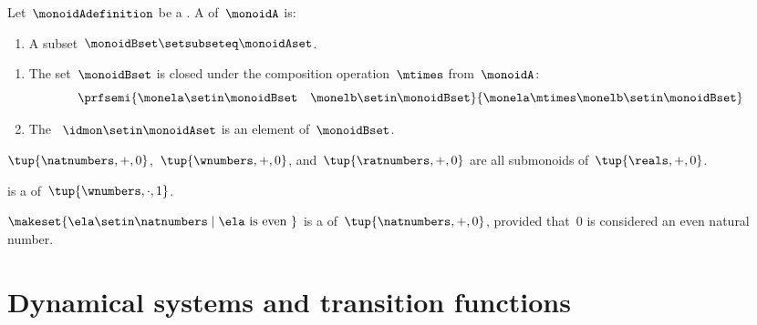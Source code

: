 \begin{definition}[Submonoids]\label{def:submonoids}
    Let~$\monoidAdefinition$ be a .
    A  of~$\monoidA$ is:

    \constit

    \begin{enumerate}
        \item A subset~$\monoidBset \setsubseteq \monoidAset$.
    \end{enumerate}

    \condit

    \begin{enumerate}
        \item The set~$\monoidBset$ is closed under the composition operation~$\mtimes$ from~$\monoidA$:
              \begin{equation}
                  \prfsemi{\monela \setin \monoidBset \quad \monelb \setin \monoidBset}{\monela \mtimes \monelb \setin \monoidBset}
              \end{equation}

        \item The ~$\idmon \setin \monoidAset$ is an element of~$\monoidBset$.
    \end{enumerate}
\end{definition}

\begin{example}
    $\tup{\natnumbers, {{+}}, 0}$,~$\tup{\wnumbers, {{+}}, 0}$, and~$\tup{\ratnumbers, {{+}}, 0}$ are all submonoids of~$\tup{\reals, {{+}}, 0}$.
\end{example}

\begin{example}
    \natnumbers  is a  of~$\tup{\wnumbers, {{\cdot}}, 1}$.
\end{example}

\begin{example}
    $\makeset{ \ela \setin \natnumbers \mid \ela \text{ is even } }$ is a  of~$\tup{\natnumbers, {{+}}, 0}$, provided that~$0$ is considered an even natural number.
\end{example}

\section[Dynamical systems]{Dynamical systems and transition functions}


